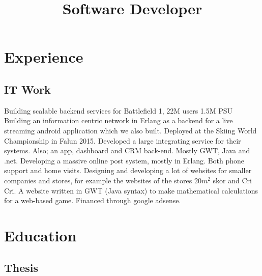 \documentclass[11pt,a4paper]{moderncv}
\title{Software Developer}
\begin{document}
\maketitle
\section{\textbf{Experience}}
\subsection{\textbf{IT Work}}
{Building scalable backend services for Battlefield 1, 22M users 1.5M PSU}
{Building an information centric network in Erlang as a backend for a live streaming android application which we also built. 
Deployed at the Skiing World Championship in Falun 2015.}
{Developed a large integrating service for their systems. Also; an app, dashboard and CRM back-end. Mostly GWT, Java and .net.}
{Developing a massive online post system, mostly in Erlang.}
{Both phone support and home visits.}
{Designing and developing a lot of websites for smaller companies and stores, for example the websites of the stores \begin{math}20m^2\end{math} skor and Cri Cri.}
{A website written in GWT (Java syntax) to make mathematical calculations for a web-based game. Financed through google adsense.}
\newpage

\section{\textbf{Education}}

\subsection{\textbf{Thesis}}
\end{document}
